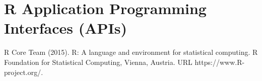 \section{R Application Programming Interfaces (APIs)}





\begin{thebibliography}{00}

R Core Team (2015). 
\newblock R: A language and environment for statistical computing. R Foundation for Statistical Computing, Vienna, Austria.
\newblock URL https://www.R-project.org/.

\end{thebibliography}

